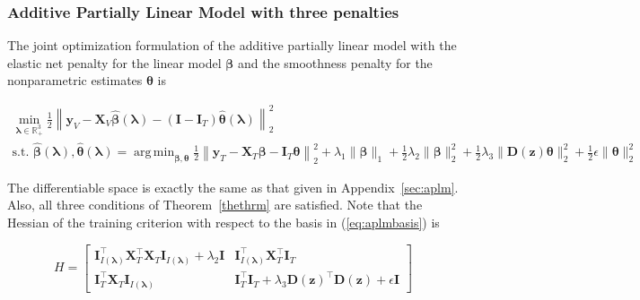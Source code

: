 \documentclass[12pt,letterpaper]{article}
\DeclareMathOperator*{\argmin}{arg\,min}
\begin{document}
\subsubsection{Additive Partially Linear Model with three penalties}

The joint optimization formulation of the additive partially linear model with the elastic net penalty for the linear model $\boldsymbol \beta$ and the smoothness penalty for the nonparametric estimates $\boldsymbol \theta$ is

\begin{equation}
\begin{array}{c}
\min_{\boldsymbol\lambda \in \mathbb{R}^3_{+}} \frac{1}{2}
\left \|
\boldsymbol{y}_V
- \boldsymbol{X}_V\hat{\boldsymbol{\beta}}(\boldsymbol{\lambda})
- (\boldsymbol{I} - \boldsymbol{I}_T) \hat{\boldsymbol{\theta}}(\boldsymbol{\lambda})
\right \|^2_2 \\
\text{s.t. }
\hat{\boldsymbol{\beta}}(\boldsymbol{\lambda}),
\hat{\boldsymbol{\theta}}(\boldsymbol{\lambda}) =
\argmin_{\boldsymbol{\beta}, \boldsymbol{\theta}}
\frac{1}{2} \left \|
\boldsymbol{y}_T
- \boldsymbol{X}_T\boldsymbol{\beta}
- \boldsymbol{I}_T \boldsymbol{\theta} \right \|^2_2
+ \lambda_1 \| \boldsymbol \beta \|_1
+ \frac{1}{2} \lambda_2 \| \boldsymbol \beta \|_2^2
+ \frac{1}{2} \lambda_3 \| \boldsymbol D(\boldsymbol z) \boldsymbol \theta \|_2^2
+ \frac{1}{2} \epsilon \| \boldsymbol{\theta} \|_2^2
\end{array}
\label{eq:aplm3JointOpt}
\end{equation}

The differentiable space is exactly the same as that given in Appendix~\ref{sec:aplm}. Also, all three conditions of Theorem~\ref{thethrm} are satisfied. Note that the Hessian of the training criterion with respect to the basis in (\ref{eq:aplmbasis}) is

\begin{equation}
H =
\begin{bmatrix}
\boldsymbol I_{I(\boldsymbol \lambda)}^\top \boldsymbol X_T^\top \boldsymbol X_T \boldsymbol I_{I(\boldsymbol \lambda)} + \lambda_2 \boldsymbol I
&  \boldsymbol I_{I(\boldsymbol \lambda)}^\top \boldsymbol X_T^\top \boldsymbol I_T \\
\boldsymbol I_T^\top \boldsymbol X_T \boldsymbol I_{I(\boldsymbol \lambda)} &
\boldsymbol I_T^\top \boldsymbol{I}_T + \lambda_3 \boldsymbol{D}(\boldsymbol{z})^\top \boldsymbol{D}(\boldsymbol{z}) + \epsilon \boldsymbol I
\end{bmatrix}
\end{equation}
\end{document}
